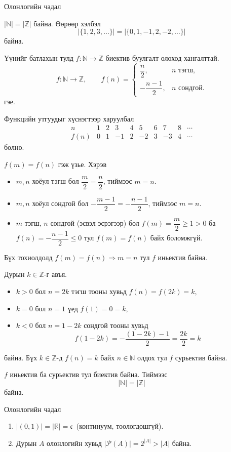 \begin{frame}[allowframebreaks]{Олонлогийн чадал}
\begin{example}
$|\mathbb{N}|=|\mathbb{Z}|$ байна. Өөрөөр хэлбэл $$|\{1, 2, 3, \ldots \}|=|\{0, 1, -1, 2, -2, \ldots\}|$$ байна.
 
Үүнийг батлахын тулд $f:\mathbb{N}\to\mathbb{Z}$
биектив буулгалт олоход хангалттай. 
\[
f:\mathbb{N}\to\mathbb{Z},\qquad
f(n)=
\begin{cases}
\dfrac{n}{2}, & n \text{ тэгш,}\\[8pt]
-\dfrac{n-1}{2}, & n \text{ сондгой.}
\end{cases}
\] гэе. 


Функцийн утгуудыг хүснэгтээр харуулбал 
\[
\begin{array}{c|ccccccccc}
n    & 1 & 2 & 3  & 4 & 5  & 6 & 7  & 8 & \cdots \\\hline
f(n) & 0 & 1 & -1 & 2 & -2 & 3 & -3 & 4 & \cdots
\end{array}
\]
болно. 

$f(m)=f(n)$ гэж үзье. Хэрэв 
\begin{itemize}
  \item $m,n$ хоёул тэгш бол
  $\dfrac{m}{2}=\dfrac{n}{2}$, тиймээс $m=n$.

  \item $m,n$ хоёул сондгой бол
  $-\dfrac{m-1}{2}=-\dfrac{n-1}{2}$, тиймээс $m=n$.

  \item $m$ тэгш, $n$ сондгой (эсвэл эсрэгээр) бол
  $f(m)=\dfrac{m}{2}\geq 1>0$ ба $f(n)=-\dfrac{n-1}{2}\leq 0$
  тул $f(m)=f(n)$ байх боломжгүй.
\end{itemize}
Бүх тохиолдолд $f(m)=f(n)\Rightarrow m=n$ тул $f$ иньектив байна.


Дурын $k\in\mathbb{Z}$-г авъя.
\begin{itemize}
  \item $k>0$ бол $n=2k$ тэгш тооны хувьд $f(n)=f(2k)=k$,
  \item $k=0$ бол $n=1$ үед $f(1)=0=k$,
  \item $k<0$ бол $n=1-2k$ сондгой тооны хувьд   
  \[
  f(1-2k)=-\frac{(1-2k)-1}{2}=\frac{2k}{2}=k
  \]
\end{itemize} байна.
Бүх $k\in\mathbb{Z}$-д $f(n)=k$ байх $n\in\mathbb{N}$ олдох тул $f$ сурьектив байна.


$f$ иньектив ба сурьектив тул биектив байна. Тиймээс $$|\mathbb{N}|=|\mathbb{Z}|$$ байна.
\end{example}
\end{frame}

\begin{frame}[allowframebreaks]{Олонлогийн чадал}
\begin{example}
    \begin{enumerate}
        \item $|(0,1)|=|\mathbb{R}|=\mathfrak{c}$ \,(континуум, тоологдошгүй).
  \item Дурын $A$ олонлогийн хувьд $|\mathcal{P}(A)|=2^{|A|}>|A|$ байна.
\end{enumerate}
\end{example}
\end{frame}


